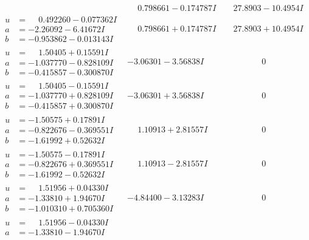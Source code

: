 \documentclass[1p]{elsarticle_modified}
\theoremstyle{definition}
\begin{document}
$$\begin{array}{c|c|c}
 & \phantom{-}0.798661 - 0.174787 I & \phantom{-}27.8903 - 10.4954 I \\ \hline\begin{aligned}
u &= \phantom{-}0.492260 - 0.077362 I \\
a &= -2.26092 - 6.41672 I \\
b &= -0.953862 - 0.013143 I\end{aligned}
 & \phantom{-}0.798661 + 0.174787 I & \phantom{-}27.8903 + 10.4954 I \\ \hline\begin{aligned}
u &= \phantom{-}1.50405 + 0.15591 I \\
a &= -1.037770 - 0.828109 I \\
b &= -0.415857 - 0.300870 I\end{aligned}
 & -3.06301 - 3.56838 I & \phantom{-0.000000 } 0 \\ \hline\begin{aligned}
u &= \phantom{-}1.50405 - 0.15591 I \\
a &= -1.037770 + 0.828109 I \\
b &= -0.415857 + 0.300870 I\end{aligned}
 & -3.06301 + 3.56838 I & \phantom{-0.000000 } 0 \\ \hline\begin{aligned}
u &= -1.50575 + 0.17891 I \\
a &= -0.822676 - 0.369551 I \\
b &= -1.61992 + 0.52632 I\end{aligned}
 & \phantom{-}1.10913 + 2.81557 I & \phantom{-0.000000 } 0 \\ \hline\begin{aligned}
u &= -1.50575 - 0.17891 I \\
a &= -0.822676 + 0.369551 I \\
b &= -1.61992 - 0.52632 I\end{aligned}
 & \phantom{-}1.10913 - 2.81557 I & \phantom{-0.000000 } 0 \\ \hline\begin{aligned}
u &= \phantom{-}1.51956 + 0.04330 I \\
a &= -1.33810 + 1.94670 I \\
b &= -1.010310 + 0.705360 I\end{aligned}
 & -4.84400 - 3.13283 I & \phantom{-0.000000 } 0 \\ \hline\begin{aligned}
u &= \phantom{-}1.51956 - 0.04330 I \\
a &= -1.33810 - 1.94670 I \\

\end{aligned}
\end{array}$$
\end{document}
